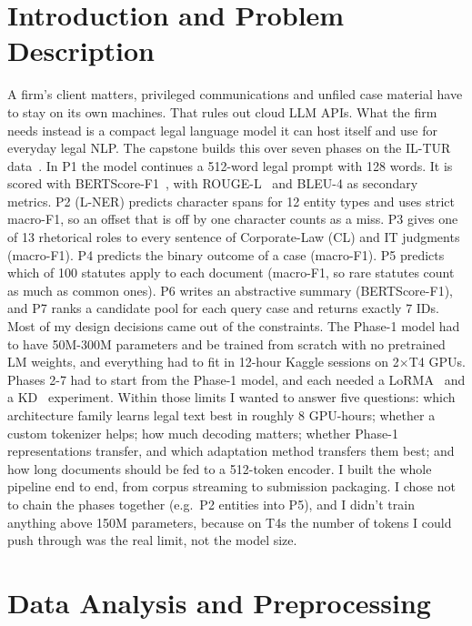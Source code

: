 \documentclass[11pt, oneside]{article}
\begin{document}
\section{Introduction and Problem Description}
A firm's client matters, privileged communications and unfiled case material
have to stay on its own machines. That rules out cloud LLM APIs. What the firm
needs instead is a compact legal language model it can host itself and use for
everyday legal NLP. The capstone builds this over seven phases on the IL-TUR
data~\cite{joshi2024iltur}.
In P1 the model continues a 512-word legal prompt with 128 words. It is scored
with BERTScore-F1~\cite{zhang2020bertscore}, with ROUGE-L~\cite{lin2004rouge} and BLEU-4 as
secondary metrics. P2 (L-NER) predicts character spans for 12 entity types and
uses strict macro-F1, so an offset that is off by one character counts as a
miss. P3 gives one of 13 rhetorical roles to every sentence of Corporate-Law
(CL) and IT judgments (macro-F1). P4 predicts the binary outcome of a case
(macro-F1). P5 predicts which of 100 statutes apply to each document (macro-F1,
so rare statutes count as much as common ones). P6 writes an abstractive
summary (BERTScore-F1), and P7 ranks a candidate pool for each query case and
returns exactly 7 IDs.
Most of my design decisions came out of the constraints. The Phase-1 model had
to have 50M-300M parameters and be trained from scratch with no pretrained LM
weights, and everything had to fit in 12-hour Kaggle sessions on 2$\times$T4
GPUs. Phases 2-7 had to start from the Phase-1 model, and each needed a
LoRMA~\cite{bihany2025lorma} and a KD~\cite{hinton2015distilling} experiment. Within those limits I wanted
to answer five questions: which architecture family learns legal text best in
roughly 8 GPU-hours; whether a custom tokenizer helps; how much decoding
matters; whether Phase-1 representations transfer, and which adaptation method
transfers them best; and how long documents should be fed to a 512-token
encoder.
I built the whole pipeline end to end, from corpus streaming to submission packaging. I chose not to chain the phases together (e.g.\ P2 entities into P5), and I didn't train anything above 150M parameters, because on T4s the number of tokens I could push through was the real limit, not the model size.

\section{Data Analysis and Preprocessing}
\end{document}
